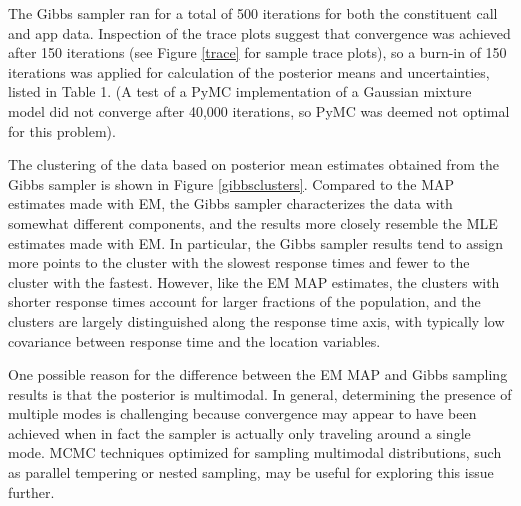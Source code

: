\documentclass[twoside]{article}
\theoremstyle{theorem}
\theoremstyle{theorem}
\theoremstyle{theorem}
\theoremstyle{lemma}
\theoremstyle{definition}
\theoremstyle{example}
\begin{document}
The Gibbs sampler ran for a total of 500 iterations for both the constituent call and app data. Inspection of the trace plots suggest that convergence was achieved after 150 iterations (see Figure \ref{trace} for sample trace plots), so a burn-in of 150 iterations was applied for calculation of the posterior means and uncertainties, listed in Table 1. (A test of a PyMC implementation of a Gaussian mixture model did not converge after 40,000 iterations, so PyMC was deemed not optimal for this problem). 

The clustering of the data based on posterior mean estimates obtained from the Gibbs sampler is shown in Figure \ref{gibbsclusters}. Compared to the MAP estimates made with EM, the Gibbs sampler characterizes the data with somewhat different components, and the results more closely resemble the MLE estimates made with EM. In particular, the Gibbs sampler results tend to assign more points to the cluster with the slowest response times and fewer to the cluster with the fastest. However, like the EM MAP estimates, the clusters with shorter response times account for larger fractions of the population, and the clusters are largely distinguished along the response time axis, with typically low covariance between response time and the location variables. 

One possible reason for the difference between the EM MAP and Gibbs sampling results is that the posterior is multimodal. In general, determining the presence of multiple modes is challenging because convergence may appear to have been achieved when in fact the sampler is actually only traveling around a single mode. MCMC techniques optimized for sampling multimodal distributions, such as parallel tempering or nested sampling, may be useful for exploring this issue further. 
\end{document}
